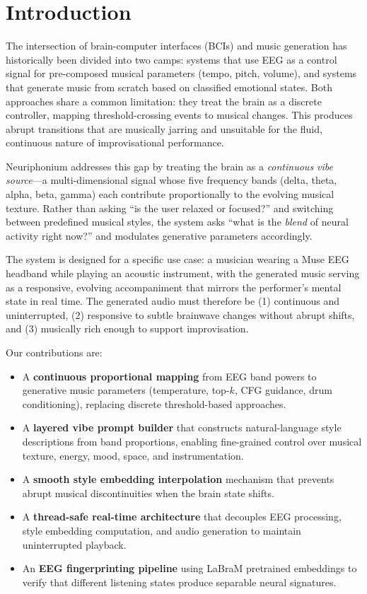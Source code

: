 \documentclass[manuscript,review,anonymous]{acmart}
\begin{document}
\section{Introduction}

The intersection of brain-computer interfaces (BCIs) and music generation has historically been divided into two camps: systems that use EEG as a control signal for pre-composed musical parameters (tempo, pitch, volume), and systems that generate music from scratch based on classified emotional states. Both approaches share a common limitation: they treat the brain as a discrete controller, mapping threshold-crossing events to musical changes. This produces abrupt transitions that are musically jarring and unsuitable for the fluid, continuous nature of improvisational performance.

Neuriphonium addresses this gap by treating the brain as a \emph{continuous vibe source}---a multi-dimensional signal whose five frequency bands (delta, theta, alpha, beta, gamma) each contribute proportionally to the evolving musical texture. Rather than asking ``is the user relaxed or focused?'' and switching between predefined musical styles, the system asks ``what is the \emph{blend} of neural activity right now?'' and modulates generative parameters accordingly.

The system is designed for a specific use case: a musician wearing a Muse EEG headband while playing an acoustic instrument, with the generated music serving as a responsive, evolving accompaniment that mirrors the performer's mental state in real time. The generated audio must therefore be (1) continuous and uninterrupted, (2) responsive to subtle brainwave changes without abrupt shifts, and (3) musically rich enough to support improvisation.

Our contributions are:
\begin{itemize}[nosep]
  \item A \textbf{continuous proportional mapping} from EEG band powers to generative music parameters (temperature, top-$k$, CFG guidance, drum conditioning), replacing discrete threshold-based approaches.
  \item A \textbf{layered vibe prompt builder} that constructs natural-language style descriptions from band proportions, enabling fine-grained control over musical texture, energy, mood, space, and instrumentation.
  \item A \textbf{smooth style embedding interpolation} mechanism that prevents abrupt musical discontinuities when the brain state shifts.
  \item A \textbf{thread-safe real-time architecture} that decouples EEG processing, style embedding computation, and audio generation to maintain uninterrupted playback.
  \item An \textbf{EEG fingerprinting pipeline} using LaBraM pretrained embeddings to verify that different listening states produce separable neural signatures.
\end{itemize}
\end{document}
